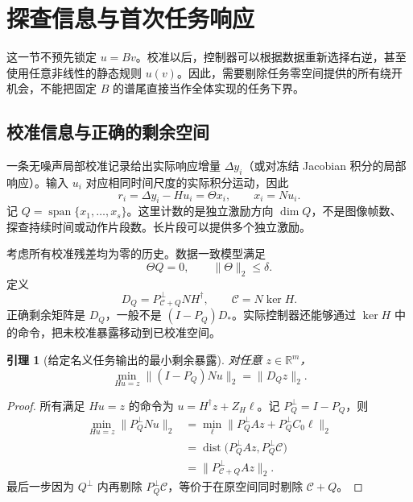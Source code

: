 \documentclass[11pt,a4paper]{article}
\numberwithin{equation}{section}
\newtheorem{lemma}[theorem]{引理}
\theoremstyle{definition}
\begin{document}
\section{探查信息与首次任务响应}
\label{sec:cal-minimax}

这一节不预先锁定 $u=Bv$。校准以后，控制器可以根据数据重新选择右逆，甚至使用任意非线性的静态规则 $u(v)$。因此，需要剔除任务零空间提供的所有绕开机会，不能把固定 $B$ 的谱尾直接当作全体实现的任务下界。

\subsection{校准信息与正确的剩余空间}

一条无噪声局部校准记录给出实际响应增量 $\Delta y_i$（或对冻结 Jacobian 积分的局部响应）。输入 $u_i$ 对应相同时间尺度的实际积分运动，因此
\begin{equation}
  r_i=\Delta y_i-Hu_i=\Theta x_i,\qquad x_i=Nu_i .
  \label{eq:cal-probe-oracle}
\end{equation}
记 $Q=\operatorname{span}\{x_1,\ldots,x_s\}$。这里计数的是独立激励方向 $\dim Q$，不是图像帧数、探查持续时间或动作片段数。长片段可以提供多个独立激励。

考虑所有校准残差均为零的历史。数据一致模型满足
\begin{equation}
  \Theta Q=0,\qquad \|\Theta\|_2\le\delta .
  \label{eq:cal-zero-history}
\end{equation}
定义
\begin{equation}
  D_Q=P_{\mathcal C+Q}^{\perp}NH^\dagger,
  \qquad \mathcal C=N\ker H .
  \label{eq:cal-DQ}
\end{equation}
正确剩余矩阵是 $D_Q$，一般不是 $(I-P_Q)D_*$。实际控制器还能够通过 $\ker H$ 中的命令，把未校准暴露移动到已校准空间。

\begin{lemma}[给定名义任务输出的最小剩余暴露]
\label{lem:cal-DQ}
对任意 $z\in\mathbb R^m$，
\begin{equation}
  \min_{Hu=z}\|(I-P_Q)Nu\|_2
  =\|D_Qz\|_2 .
  \label{eq:cal-exposure-z}
\end{equation}
\end{lemma}

\begin{proof}
所有满足 $Hu=z$ 的命令为 $u=H^\dagger z+Z_H\ell$。记 $P_Q^\perp=I-P_Q$，则
\begin{align}
  \min_{Hu=z}\|P_Q^\perp Nu\|_2
  &=
  \min_\ell
  \|P_Q^\perp Az+P_Q^\perp C_0\ell\|_2\\
  &=
  \operatorname{dist}
  \big(P_Q^\perp Az,P_Q^\perp\mathcal C\big)\\
  &=\|P_{\mathcal C+Q}^\perp Az\|_2 .
\end{align}
最后一步因为 $Q^\perp$ 内再剔除 $P_Q^\perp\mathcal C$，等价于在原空间同时剔除 $\mathcal C+Q$。
\end{proof}
\end{document}
